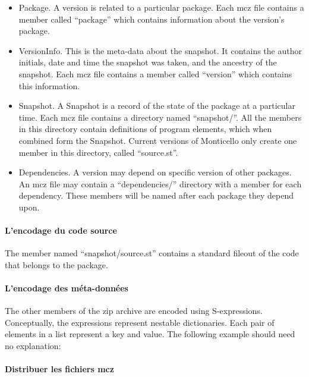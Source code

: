 \documentclass[a4paper,10pt,twoside]{book}
\begin{document}
\begin{itemize}
\item Package. A version is related to a particular package. Each mcz file contains a member called ``package'' which contains information about the version's package.

\item VersionInfo. This is the meta-data about the snapshot. It contains the author initials, date and time the snapshot was taken, and the ancestry of the snapshot. Each mcz file contains a member called ``version'' which contains this information.
\item Snapshot. A Snapshot is a record of the state of the package at a particular time. Each mcz file contains a directory named ``snapshot/''. All the members in this directory contain definitions of program elements, which when combined form the Snapshot. Current versions of Monticello only create one member in this directory, called ``source.st''.
\item Dependencies. A version may depend on specific version of other packages. An mcz file may contain a ``dependencies/'' directory with a member for each dependency. These members will be named after each package they  depend upon.
\end{itemize}

\paragraph{L'encodage du code source} %

The member named ``snapshot/source.st'' contains a standard fileout of the code that belongs to the package.

\paragraph{L'encodage des m\'eta-donn\'ees} %

The other members of the zip archive are encoded using S-expressions. Conceptually, the expressions represent nestable dictionaries. Each pair of elements in a list represent a key and value. The following example should need no explanation: 


\paragraph{Distribuer les fichiers mcz} %
\end{document}
